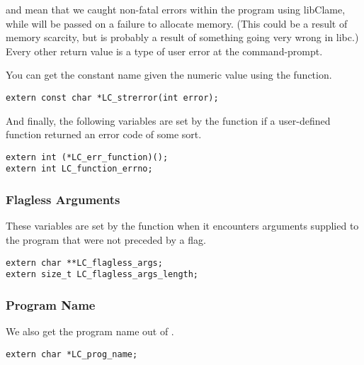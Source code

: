  and  mean that we caught non-fatal errors within the program using libClame, while  will be passed on a failure to allocate memory. (This could be a result of memory scarcity, but is probably a result of something going very wrong in libc.) Every other return value is a type of user error at the command-prompt.

You can get the constant name given the numeric value using the  function.

\begin{verbatim}
extern const char *LC_strerror(int error);
\end{verbatim}

And finally, the following variables are set by the  function if a user-defined function returned an error code of some sort.

\begin{verbatim}
extern int (*LC_err_function)();
extern int LC_function_errno;
\end{verbatim}

\subsubsection{Flagless Arguments}

These variables are set by the  function when it encounters arguments supplied to the program that were not preceded by a flag.

\begin{verbatim}
extern char **LC_flagless_args;
extern size_t LC_flagless_args_length;
\end{verbatim}

\subsubsection{Program Name}

We also get the program name out of .

\begin{verbatim}
extern char *LC_prog_name;
\end{verbatim}

